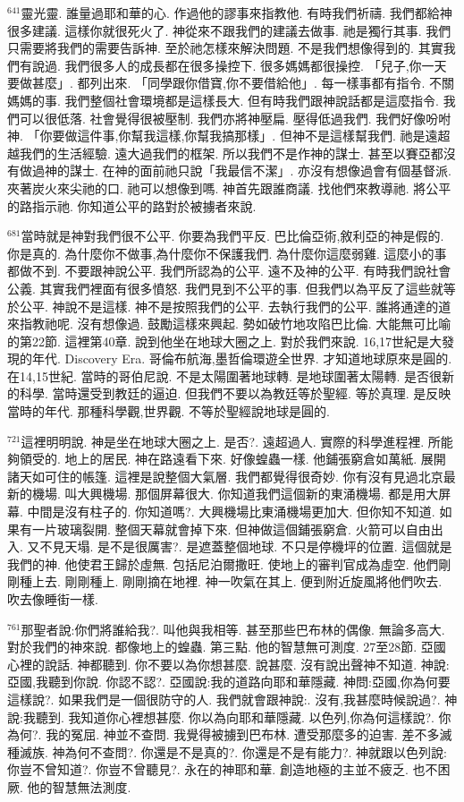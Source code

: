 \documentclass{book}
\begin{document}
$^{641}$靈光靈.
誰量過耶和華的心.
作過他的謬事來指教他.
有時我們祈禱.
我們都給神很多建議.
這樣你就很死火了.
神從來不跟我們的建議去做事.
祂是獨行其事.
我們只需要將我們的需要告訴神.
至於祂怎樣來解決問題.
不是我們想像得到的.
其實我們有說過.
我們很多人的成長都在很多操控下.
很多媽媽都很操控.
「兒子,你一天要做甚麼」.
都列出來.
「同學跟你借寶,你不要借給他」.
每一樣事都有指令.
不關媽媽的事.
我們整個社會環境都是這樣長大.
但有時我們跟神說話都是這麼指令.
我們可以很低落.
社會覺得很被壓制.
我們亦將神壓扁.
壓得低過我們.
我們好像吩咐神.
「你要做這件事,你幫我這樣,你幫我搞那樣」.
但神不是這樣幫我們.
祂是遠超越我們的生活經驗.
遠大過我們的框架.
所以我們不是作神的謀士.
甚至以賽亞都沒有做過神的謀士.
在神的面前祂只說「我最信不潔」.
亦沒有想像過會有個基督派.
夾著炭火來尖祂的口.
祂可以想像到嗎.
神首先跟誰商議.
找他們來教導祂.
將公平的路指示祂.
你知道公平的路對於被擄者來說.

$^{681}$當時就是神對我們很不公平.
你要為我們平反.
巴比倫亞術,敘利亞的神是假的.
你是真的.
為什麼你不做事,為什麼你不保護我們.
為什麼你這麼弱雞.
這麼小的事都做不到.
不要跟神說公平.
我們所認為的公平.
遠不及神的公平.
有時我們說社會公義.
其實我們裡面有很多憤怒.
我們見到不公平的事.
但我們以為平反了這些就等於公平.
神說不是這樣.
神不是按照我們的公平.
去執行我們的公平.
誰將通達的道來指教祂呢.
沒有想像過.
鼓勵這樣來興起.
勢如破竹地攻陷巴比倫.
大能無可比喻的第22節.
這裡第40章.
說到他坐在地球大圈之上.
對於我們來說.
16,17世紀是大發現的年代.
Discovery Era.
哥倫布航海,墨哲倫環遊全世界.
才知道地球原來是圓的.
在14,15世紀.
當時的哥伯尼說.
不是太陽圍著地球轉.
是地球圍著太陽轉.
是否很新的科學.
當時還受到教廷的逼迫.
但我們不要以為教廷等於聖經.
等於真理.
是反映當時的年代.
那種科學觀,世界觀.
不等於聖經說地球是圓的.

$^{721}$這裡明明說.
神是坐在地球大圈之上.
是否?.
遠超過人.
實際的科學進程裡.
所能夠領受的.
地上的居民.
神在路遠看下來.
好像蝗蟲一樣.
他鋪張窮倉如萬紙.
展開諸天如可住的帳篷.
這裡是說整個大氣層.
我們都覺得很奇妙.
你有沒有見過北京最新的機場.
叫大興機場.
那個屏幕很大.
你知道我們這個新的東涌機場.
都是用大屏幕.
中間是沒有柱子的.
你知道嗎?.
大興機場比東涌機場更加大.
但你知不知道.
如果有一片玻璃裂開.
整個天幕就會掉下來.
但神做這個鋪張窮倉.
火箭可以自由出入.
又不見天塌.
是不是很厲害?.
是遮蓋整個地球.
不只是停機坪的位置.
這個就是我們的神.
他使君王歸於虛無.
包括尼泊爾撒旺.
使地上的審判官成為虛空.
他們剛剛種上去.
剛剛種上.
剛剛摘在地裡.
神一吹氣在其上.
便到附近旋風將他們吹去.
吹去像睡街一樣.

$^{761}$那聖者說:你們將誰給我?.
叫他與我相等.
甚至那些巴布林的偶像.
無論多高大.
對於我們的神來說.
都像地上的蝗蟲.
第三點.
他的智慧無可測度.
27至28節.
亞國心裡的說話.
神都聽到.
你不要以為你想甚麼.
說甚麼.
沒有說出聲神不知道.
神說:亞國,我聽到你說.
你認不認?.
亞國說:我的道路向耶和華隱藏.
神問:亞國,你為何要這樣說?.
如果我們是一個很防守的人.
我們就會跟神說:.
沒有,我甚麼時候說過?.
神說:我聽到.
我知道你心裡想甚麼.
你以為向耶和華隱藏.
以色列,你為何這樣說?.
你為何?.
我的冤屈.
神並不查問.
我覺得被擄到巴布林.
遭受那麼多的迫害.
差不多滅種滅族.
神為何不查問?.
你還是不是真的?.
你還是不是有能力?.
神就跟以色列說:你豈不曾知道?.
你豈不曾聽見?.
永在的神耶和華.
創造地極的主並不疲乏.
也不困厥.
他的智慧無法測度.
\end{document}

